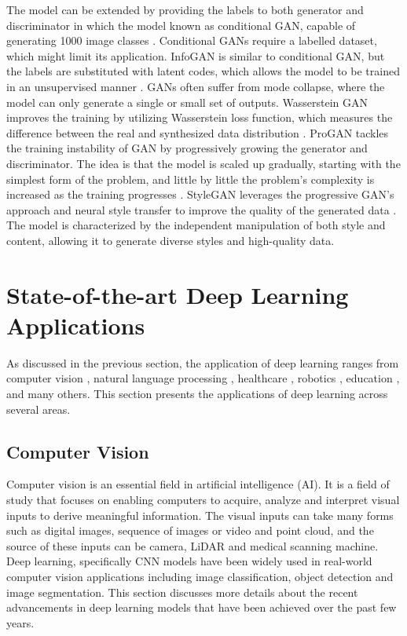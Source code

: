 \documentclass[preprint,12pt]{elsarticle}
\begin{document}
The model can be extended by providing the labels to both generator and discriminator in which the model known as conditional GAN, capable of generating 1000 image classes \citep{odena_conditional_2017}. Conditional GANs require a labelled dataset, which might limit its application. InfoGAN is similar to conditional GAN, but the labels are substituted with latent codes, which allows the model to be trained in an unsupervised manner \citep{chen_infogan_2016}. GANs often suffer from mode collapse, where the model can only generate a single or small set of outputs. Wasserstein GAN improves the training by utilizing Wasserstein loss function, which measures the difference between the real and synthesized data distribution \citep{weng_gan_2019}. ProGAN tackles the training instability of GAN by progressively growing the generator and discriminator. The idea is that the model is scaled up gradually, starting with the simplest form of the problem, and little by little the problem’s complexity is increased as the training progresses \citep{karras_progressive_2018}. StyleGAN leverages the progressive GAN’s approach and neural style transfer to improve the quality of the generated data \citep{karras_style-based_2019}. The model is characterized by the independent manipulation of both style and content, allowing it to generate diverse styles and high-quality data.

\section{State-of-the-art Deep Learning Applications}\label{sec4}
As discussed in the previous section, the application of deep learning ranges from computer vision \citep{Tan_2020_CVPR}, natural language processing \citep{Otter}, healthcare \citep{esteva2019guide}, robotics \citep{soori2023artificial}, education \citep{hernandez2019systematic}, and many others. This section presents the applications of deep learning across several areas.

\subsection{Computer Vision}
Computer vision is an essential field in artificial intelligence (AI). It is a field of study that focuses on enabling computers to acquire, analyze and interpret visual inputs to derive meaningful information. The visual inputs can take many forms such as digital images, sequence of images or video and point cloud, and the source of these inputs can be camera, LiDAR and medical scanning machine. Deep learning, specifically CNN models have been widely used in real-world computer vision applications including image classification, object detection and image segmentation. This section discusses more details about the recent advancements in deep learning models that have been achieved over the past few years.
\end{document}
